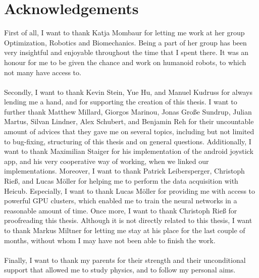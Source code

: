 \chapter{Acknowledgements}
First of all, I want to thank Katja Mombaur for letting me work at her group Optimization, Robotics and Biomechanics. Being a part of her group has been very insightful and enjoyable throughout the time that I spent there. It was an honour for me to be given the chance and work on humanoid robots, to which not many have access to.\\\\
Secondly, I want to thank Kevin Stein, Yue Hu, and Manuel Kudruss for always lending me a hand, and for supporting the creation of this thesis. I want to further thank Matthew Millard, Giorgos Marinou, Jonas Große Sundrup, Julian Martus, Silvan Lindner, Alex Schubert, and Benjamin Reh for their uncountable amount of advices that they gave me on several topics, including but not limited to bug-fixing, structuring of this thesis and on general questions. Additionally, I want to thank Maximilian Staiger for his implementation of the android joystick app, and his very cooperative way of working, when we linked our implementations. Moreover, I want to thank Patrick Leibersperger, Christoph Rieß, and Lucas Möller for helping me to perform the data acquisition with Heicub. Especially, I want to thank Lucas Möller for providing me with access to powerful GPU clusters, which enabled me to train the neural networks in a reasonable amount of time. Once more, I want to thank Christoph Rieß for proofreading this thesis. Although it is not directly related to this thesis, I want to thank Markus Miltner for letting me stay at his place for the last couple of months, without whom I may have not been able to finish the work.\\\\
Finally, I want to thank my parents for their strength and their unconditional support that allowed me to study physics, and to follow my personal aims.